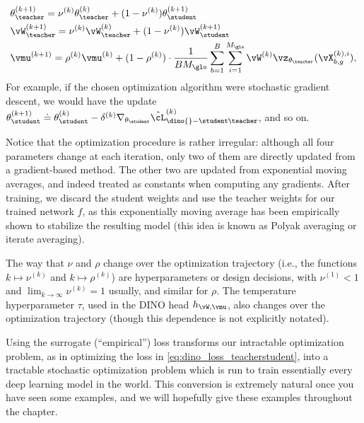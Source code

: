 \documentclass[../../book-main.tex]{subfiles}
\begin{document}
\begin{itemize}
\begin{align}
            &\theta_{\teacher}^{(k + 1)}
            = \nu^{(k)}\theta_{\teacher}^{(k)} + (1 -
            \nu^{(k)})\theta_{\student}^{(k + 1)} \\
            &\vW_{\teacher}^{(k + 1)}
            = \nu^{(k)}\vW_{\teacher}^{(k)} + (1 -
            \nu^{(k)})\vW_{\student}^{(k + 1)} \\
            &\vmu^{(k + 1)}
            = \rho^{(k)}\vmu^{(k)} + (1 -
            \rho^{(k)})\cdot\frac{1}{BM_{\glo}}\sum_{b =
            1}^{B}\sum_{i =
            1}^{M_{\glo}}\vW^{(k)}\vz_{\theta_{\teacher}}(\vX_{b, g}^{(k), i}),
        \end{align}
        For example, if the chosen optimization algorithm were
        stochastic gradient descent, we would have the update
        \(\theta_{\student}^{(k + 1)} \doteq \theta_{\student}^{(k)}
            -
        \delta^{(k)}\nabla_{\theta_{\student}}\hat{\cL}_{\dino{}-\student\teacher}^{(k)}\),
        and so on.
\end{itemize}
Notice that the optimization procedure is rather irregular: although
all four parameters change at each iteration, only two of them are
directly updated from a gradient-based method. The other two are
updated from exponential moving averages, and indeed treated as
constants when computing any gradients. After training, we discard
the student weights and use the teacher weights for our trained
network \(f\), as this exponentially moving average has been
empirically shown to stabilize the resulting model (this idea is
known as Polyak averaging or iterate averaging).

The way that \(\nu\) and \(\rho\) change over the optimization
trajectory (i.e., the functions \(k \mapsto \nu^{(k)}\) and \(k
\mapsto \rho^{(k)}\)) are hyperparameters or design decisions, with
\(\nu^{(1)} < 1\) and \(\lim_{k \to \infty}\nu^{(k)} = 1\) usually,
and similar for \(\rho\). The temperature hyperparameter \(\tau\),
used in the DINO head \(h_{\vW, \vmu}\), also changes over the
optimization trajectory (though this dependence is not explicitly notated).

Using the surrogate (``empirical'') loss transforms our intractable
optimization problem, as in optimizing the loss in
\eqref{eq:dino_loss_teacherstudent}, into a tractable stochastic
optimization problem which is run to train essentially every deep
learning model in the world. This conversion is extremely natural
once you have seen some examples, and we will hopefully give these
examples throughout the chapter.
\end{document}
